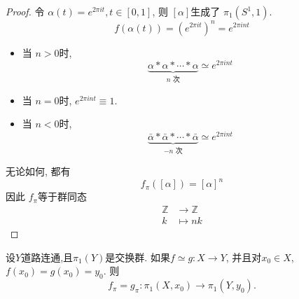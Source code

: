 \documentclass[../main.tex]{subfiles}
\begin{document}
\begin{proof}
    令 \(  \alpha \left( t \right)= e^{2 \pi it},t\in \left[ 0,1 \right]    \), 则 \(  [\alpha ]  \)生成了 \(   \pi _1 \left( S^{1},1 \right)   \).  \[
    f\left( \alpha \left( t \right)  \right)= \left( e^{2 \pi it} \right)^{n}= e^{2  \pi int}
    \]
    \begin{itemize}
        \item 当 \(  n> 0  \)时,  \[
        \underbrace{\alpha * \alpha * \cdots * \alpha}_{n \text{ 次}}\simeq  e^{2 \pi int}
        \] 
        \item 当 \(  n = 0  \)时, \(  e^{2 \pi int}\equiv 1  \).
        \item 当 \(  n< 0  \)时, \[
        \underbrace{\bar{\alpha} * \bar{\alpha} * \cdots * \bar{\alpha}}_{-n \text{ 次}}\simeq  e^{2 \pi int}
        \]   
    \end{itemize}
    
    无论如何, 都有 \[
    f_{ \pi }\left( [\alpha ] \right)= [\alpha ]^{n} 
    \]因此 \(  f_{ \pi }  \)等于群同态  \[
 \begin{aligned}
    \mathbb{Z}&\to \mathbb{Z} \\ 
     k&\mapsto nk 
 \end{aligned}
    \]
\end{proof}
\begin{exercise}{}{}
设\(Y\)道路连通,且\(\pi_{1}(Y)\)是交换群. 如果\(f\simeq g:X\to Y\), 并且对\(x_{0}\in X\), \(f(x_{0})=g(x_{0})=y_{0}\). 则
\[
f_{\pi}=g_{\pi}:\pi_{1}(X,x_{0})\to\pi_{1}(Y,y_{0}).
\]
\end{exercise}
\end{document}

